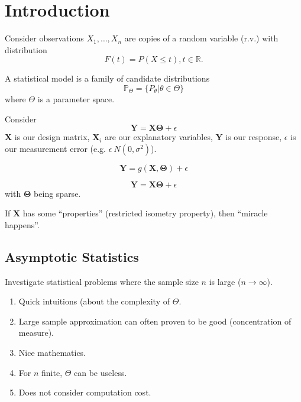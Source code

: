 \chapter{Introduction}
\label{cha:introduction}

Consider observations $X_{1}, \dots, X_{n}$ are copies of a random
variable (r.v.) with distribution $$F(t) = P(X \leq t), t \in
\mathbb{R}.$$

\begin{defn}
  A statistical model is a family of candidate distributions 
  $$\mathbb{P}_{\Theta} = \{ P_{\theta} | \theta \in \Theta \}$$ where
  $\Theta$ is a parameter space.
\end{defn}

\begin{exmp}
  Consider
  \begin{equation}
    \label{eq:1}
    \mathbf{Y} = \mathbf{X \Theta} + \epsilon
  \end{equation}
  $\mathbf{X}$ is our design matrix, $\mathbf{X}_{i}$ are our
  explanatory variables, $\mathbf{Y}$ is our response, $\epsilon$ is
  our measurement error (e.g. $\epsilon ~ N(0, \sigma^{2})$).
\end{exmp}


\begin{exmp}
  \begin{equation}
    \label{eq:2}
    \mathbf{Y} = g(\mathbf{X}, \mathbf{\Theta}) + \epsilon
  \end{equation}
\end{exmp}

\begin{exmp}
  \begin{equation}
    \label{eq:3}
    \mathbf{Y} = \mathbf{X \Theta} + \epsilon
  \end{equation}
  with $\mathbf{\Theta}$ being sparse.

  If $\mathbf{X}$ has some ``properties'' (restricted isometry property), then ``miracle happens''.
\end{exmp}

\section{Asymptotic Statistics}
\label{sec:asympt-stat}

Investigate statistical problems where the sample size $n$ is large
($n \rightarrow \infty$).
\begin{enumerate}
\item Quick intuitions (about the complexity of $\Theta$.
\item Large sample approximation can often proven to be good
  (concentration of measure).
\item Nice mathematics.
\item For $n$ finite, $\Theta$ can be useless.
\item Does not consider computation cost.
\end{enumerate}

